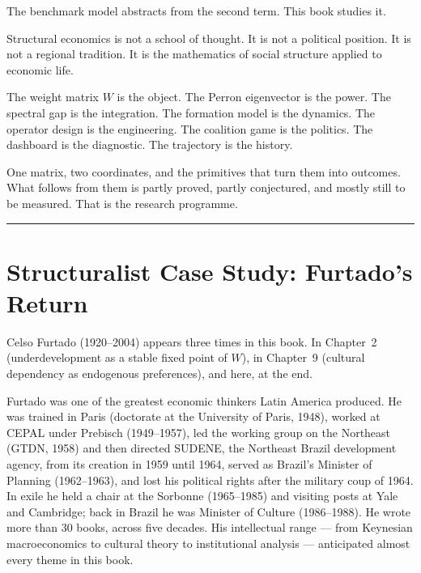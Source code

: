 \documentclass[../structural_economics_book.tex]{subfiles}
\begin{document}
The benchmark model abstracts from the second term. This book studies it.

\begin{keyinsight}
Structural economics is not a school of thought. It is not a political position. It is not a regional tradition. It is the mathematics of social structure applied to economic life.

The weight matrix $W$ is the object. The Perron eigenvector is the power. The spectral gap is the integration. The formation model is the dynamics. The operator design is the engineering. The coalition game is the politics. The dashboard is the diagnostic. The trajectory is the history.

One matrix, two coordinates, and the primitives that turn them into outcomes. What follows from them is partly proved, partly conjectured, and mostly still to be measured. That is the research programme.
\end{keyinsight}

\vspace{2em}

\begin{center}
\rule{5cm}{0.4pt}
\end{center}


\newpage
\section*{Structuralist Case Study: Furtado's Return}

Celso Furtado (1920--2004) appears three times in this book. In Chapter~2 (underdevelopment as a stable fixed point of $W$), in Chapter~9 (cultural dependency as endogenous preferences), and here, at the end.

Furtado was one of the greatest economic thinkers Latin America produced. He was trained in Paris (doctorate at the University of Paris, 1948), worked at CEPAL under Prebisch (1949--1957), led the working group on the Northeast (GTDN, 1958) and then directed SUDENE, the Northeast Brazil development agency, from its creation in 1959 until 1964, served as Brazil's Minister of Planning (1962--1963), and lost his political rights after the military coup of 1964. In exile he held a chair at the Sorbonne (1965--1985) and visiting posts at Yale and Cambridge; back in Brazil he was Minister of Culture (1986--1988). He wrote more than 30 books, across five decades. His intellectual range --- from Keynesian macroeconomics to cultural theory to institutional analysis --- anticipated almost every theme in this book.
\end{document}
